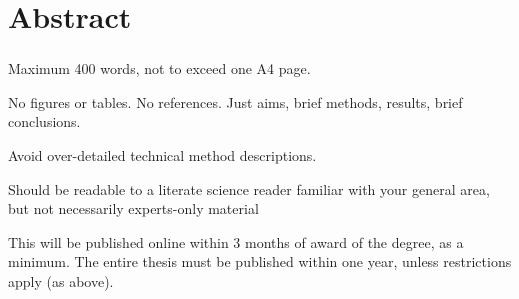 \chapter*{Abstract} 

\subsection*{\thesistitle}

Maximum 400 words, not to exceed one A4 page. 

No figures or tables.  No references.  Just aims, brief methods, results, brief conclusions.

Avoid over-detailed technical method descriptions.

Should be readable to a literate science reader familiar with your general area, but not necessarily experts-only material

This will be published online within 3 months of award of the degree, as a minimum.  The entire thesis must be published within one year, unless restrictions apply (as above).